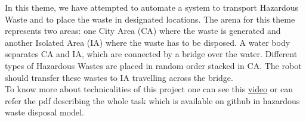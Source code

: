 \documentclass[a4paper,12pt,oneside]{article}
\begin{document}
In this theme, we have attempted to automate a system to transport Hazardous Waste and to place the waste in designated locations. The arena for this theme represents two areas: one City Area (CA) where the waste is generated and another Isolated Area (IA) where the waste has to be disposed. A water body separates CA and IA, which are connected by a bridge over the water. Different types of Hazardous Wastes are placed in random order stacked in CA. The robot should transfer these wastes to IA travelling across the bridge.\\
To know more about technicalities of this project one can see this \href{https://www.youtube.com/watch?v=L6Ta_fylXQA
}{video} or can refer the pdf describing the whole task which is available on github in hazardous waste disposal model.\\
\end{document}
